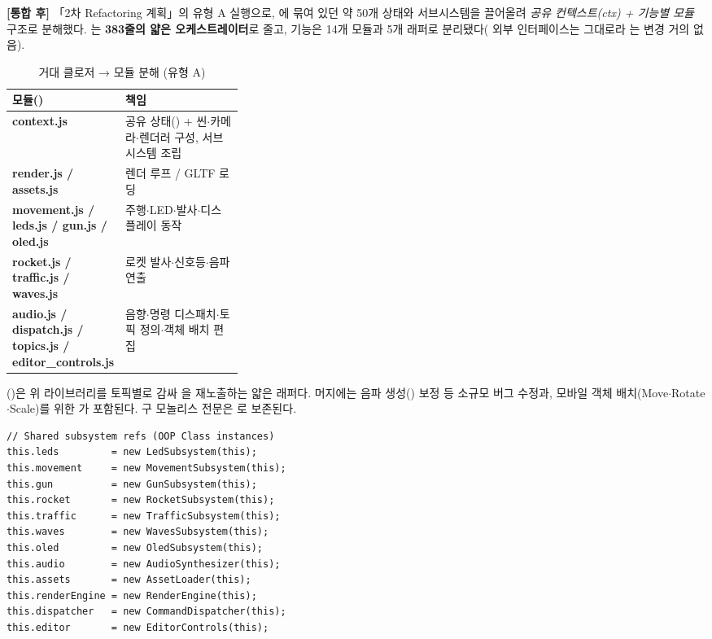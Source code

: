 \smallskip
\noindent\textbf{[통합 후]} 「2차 Refactoring 계획」의 유형 A 실행으로,
에 묶여 있던 약 50개 상태와 서브시스템을 끌어올려 \emph{공유
컨텍스트(ctx) + 기능별 모듈} 구조로 분해했다. 는 \textbf{383줄의 얇은
오케스트레이터}로 줄고, 기능은  14개 모듈과 
5개 래퍼로 분리됐다( 외부 인터페이스는 그대로라 는
변경 거의 없음).

\begin{table}[htbp]\centering\small
\caption{거대 클로저  → 모듈 분해 (유형 A)}
\renewcommand{\arraystretch}{1.2}
\begin{tabularx}{\linewidth}{@{}>{\sffamily\bfseries}L{0.33\linewidth} >{\raggedright\arraybackslash}X@{}}
\toprule
\sffamily 모듈() & \sffamily 책임 \\
\midrule
context.js  & 공유 상태() + 씬$\cdot$카메라$\cdot$렌더러 구성, 서브시스템 조립 \\
render.js / assets.js & 렌더 루프 / GLTF 로딩 \\
movement.js / leds.js / gun.js / oled.js & 주행$\cdot$LED$\cdot$발사$\cdot$디스플레이 동작 \\
rocket.js / traffic.js / waves.js & 로켓 발사$\cdot$신호등$\cdot$음파 연출 \\
audio.js / dispatch.js / topics.js / editor\_controls.js & 음향$\cdot$명령 디스패치$\cdot$토픽 정의$\cdot$객체 배치 편집 \\
\bottomrule
\end{tabularx}
\end{table}

\noindent {}()은 위 라이브러리를 토픽별로 감싸 을 재노출하는
얇은 래퍼다. 머지에는 음파 생성() 보정 등 소규모 버그 수정과,
모바일 객체 배치(Move$\cdot$Rotate$\cdot$Scale)를 위한 가 포함된다.
구 모놀리스 전문은 로 보존된다.

\begin{verbatim}
// Shared subsystem refs (OOP Class instances)
this.leds         = new LedSubsystem(this);
this.movement     = new MovementSubsystem(this);
this.gun          = new GunSubsystem(this);
this.rocket       = new RocketSubsystem(this);
this.traffic      = new TrafficSubsystem(this);
this.waves        = new WavesSubsystem(this);
this.oled         = new OledSubsystem(this);
this.audio        = new AudioSynthesizer(this);
this.assets       = new AssetLoader(this);
this.renderEngine = new RenderEngine(this);
this.dispatcher   = new CommandDispatcher(this);
this.editor       = new EditorControls(this);
\end{verbatim}

